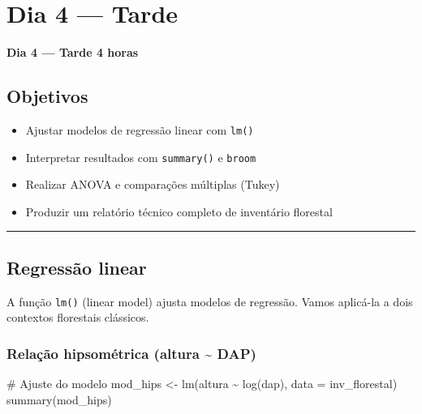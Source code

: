 \documentclass[
  letterpaper,
]{scrbook}
\newenvironment{Shaded}{\begin{snugshade}}{\end{snugshade}}
\newcommand{\AttributeTok}[1]{\textcolor[rgb]{0.40,0.45,0.13}{#1}}
\newcommand{\CommentTok}[1]{\textcolor[rgb]{0.37,0.37,0.37}{#1}}
\newcommand{\FunctionTok}[1]{\textcolor[rgb]{0.28,0.35,0.67}{#1}}
\newcommand{\NormalTok}[1]{\textcolor[rgb]{0.00,0.23,0.31}{#1}}
\newcommand{\OtherTok}[1]{\textcolor[rgb]{0.00,0.23,0.31}{#1}}
\newcommand{\SpecialCharTok}[1]{\textcolor[rgb]{0.37,0.37,0.37}{#1}}
\providecommand{\tightlist}{%
  \setlength{\itemsep}{0pt}\setlength{\parskip}{0pt}}
\begin{document}
\chapter{Dia 4 --- Tarde}\label{dia-4-tarde}

\textbf{Dia 4 --- Tarde \textbar{} 4 horas}

\section*{Objetivos}\label{objetivos-7}


\begin{itemize}
\tightlist
\item
  Ajustar modelos de regressão linear com \texttt{lm()}
\item
  Interpretar resultados com \texttt{summary()} e \texttt{broom}
\item
  Realizar ANOVA e comparações múltiplas (Tukey)
\item
  Produzir um relatório técnico completo de inventário florestal
\end{itemize}

\begin{center}\rule{0.5\linewidth}{0.5pt}\end{center}

\section{Regressão linear}\label{regressuxe3o-linear}

A função \texttt{lm()} (linear model) ajusta modelos de regressão. Vamos
aplicá-la a dois contextos florestais clássicos.

\subsection{Relação hipsométrica (altura \textasciitilde{}
DAP)}\label{relauxe7uxe3o-hipsomuxe9trica-altura-dap}

\begin{Shaded}
\begin{Highlighting}[]
\CommentTok{\# Ajuste do modelo}
\NormalTok{mod\_hips }\OtherTok{\textless{}{-}} \FunctionTok{lm}\NormalTok{(altura }\SpecialCharTok{\textasciitilde{}} \FunctionTok{log}\NormalTok{(dap), }\AttributeTok{data =}\NormalTok{ inv\_florestal)}
\FunctionTok{summary}\NormalTok{(mod\_hips)}
\end{Highlighting}
\end{Shaded}
\end{document}
